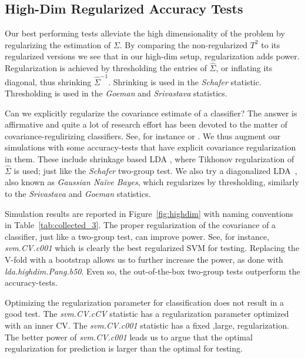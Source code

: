 \documentclass[]{bio}
\begin{document}
\subsection{High-Dim Regularized Accuracy Tests}
\label{sec:highdim}

Our best performing tests alleviate the high dimensionality of the problem by regularizing the estimation of $\Sigma$. 
By comparing the non-regularized $T^2$ to its regularized versions we see that in our high-dim setup, regularization adds power. 
Regularization is achieved by thresholding the entries of $\hat{\Sigma}$, or inflating its diagonal, thus shrinking $\hat \Sigma^{-1}$. 
Shrinking is used in the \emph{Schafer} statistic.
Thresholding is used in the \emph{Goeman} and \emph{Srivastava} statistics.

Can we explicitly regularize the covariance estimate of a classifier?
The answer is affirmative and quite a lot of research effort has been devoted to the matter of covariance-regulirizing classifiers. 
See, for instance \cite{bickel2004some} or \cite{dobriban2018high}.
We thus augment our simulations with some accuracy-tests that have explicit covariance regularization in them. 
These include shrinkage based LDA \citep{pang_shrinkage-based_2009,ramey_high-dimensional_2016}, where Tikhonov regularization of $\hat \Sigma$ is used; just like the \emph{Schafer} two-group test.
We also try a diagonalized LDA~\citep{dudoit_comparison_2002}, also known as \emph{Gaussian Na\"ive Bayes}, which regularizes by thresholding, similarly to the \emph{Srivastava} and \emph{Goeman} statistics.

Simulation results are reported in Figure~\ref{fig:highdim} with naming conventions in Table~\ref{tab:collected_3}.
The proper regularization of the covariance of a classifier, just like a two-group test, can improve power. 
See, for instance, \emph{svm.CV.c001} which is clearly the best regularized SVM for testing. 
Replacing the V-fold  with a bootstrap allows us to further increase the power, as done with \emph{lda.highdim.Pang.b50}.
Even so, the out-of-the-box two-group tests outperform the accuracy-tests.

Optimizing the regularization parameter for classification does not result in a good test.
The \emph{svm.CV.cCV} statistic has a regularization parameter optimized with an inner CV. 
The \emph{svm.CV.c001} statistic has a fixed ,large, regularization.
The better power of \emph{svm.CV.c001} leads us to argue that the optimal regularization for prediction is larger than the optimal for testing.
\end{document}
